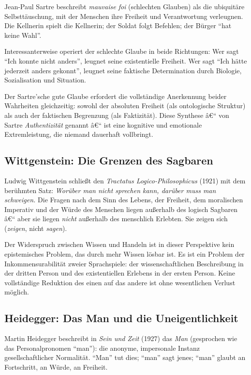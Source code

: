 ﻿\documentclass[12pt, a4paper]{article}
\begin{document}
Jean-Paul Sartre beschreibt \emph{mauvaise foi} (schlechten Glauben) als die
ubiquitäre Selbsttäuschung, mit der Menschen ihre Freiheit und Verantwortung
verleugnen. Die Kellnerin spielt die Kellnerin; der Soldat folgt Befehlen;
der Bürger \enquote{hat keine Wahl}.

Interessanterweise operiert der schlechte Glaube in beide Richtungen: Wer sagt
\enquote{Ich konnte nicht anders}, leugnet seine existentielle Freiheit. Wer sagt
\enquote{Ich hätte jederzeit anders gekonnt}, leugnet seine faktische Determination
durch Biologie, Sozialisation und Situation.

Der Sartre'sche gute Glaube erfordert die vollständige Anerkennung beider Wahrheiten
gleichzeitig: sowohl der absoluten Freiheit (als ontologische Struktur) als auch
der faktischen Begrenzung (als Faktizität). Diese Synthese â€“ von Sartre
\emph{Authentizität} genannt â€“ ist eine kognitive und emotionale Extremleistung,
die niemand dauerhaft vollbringt.

\subsection{Wittgenstein: Die Grenzen des Sagbaren}

Ludwig Wittgenstein schließt den \textit{Tractatus Logico-Philosophicus} (1921)
mit dem berühmten Satz: \textit{Worüber man nicht sprechen kann, darüber muss man
schweigen.} Die Fragen nach dem Sinn des Lebens, der Freiheit, dem moralischen
Imperativ und der Würde des Menschen liegen außerhalb des logisch Sagbaren â€“
aber sie liegen \emph{nicht} außerhalb des menschlich Erlebten. Sie zeigen sich
(\emph{zeigen}, nicht \emph{sagen}).

Der Widerspruch zwischen Wissen und Handeln ist in dieser Perspektive kein
epistemisches Problem, das durch mehr Wissen lösbar ist. Es ist ein Problem
der Inkommensurabilität zweier Sprachspiele: der wissenschaftlichen Beschreibung
in der dritten Person und des existentiellen Erlebens in der ersten Person.
Keine vollständige Reduktion des einen auf das andere ist ohne wesentlichen
Verlust möglich.

\subsection{Heidegger: Das Man und die Uneigentlichkeit}

Martin Heidegger beschreibt in \textit{Sein und Zeit} (1927) das \emph{Man}
(gesprochen wie das Personalpronomen \enquote{man}): die anonyme, impersonale
Instanz gesellschaftlicher Normalität. \enquote{Man} tut dies; \enquote{man}
sagt jenes; \enquote{man} glaubt an Fortschritt, an Würde, an Freiheit.
\end{document}
